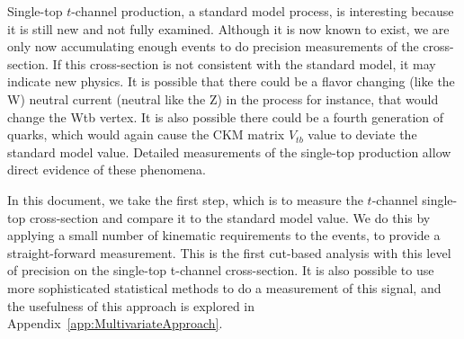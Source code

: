 Single-top $t$-channel production, a standard model process, is interesting because it is still new and not fully examined.  Although it is now known to exist, we are only now accumulating enough events to do precision measurements of the cross-section.  If this cross-section is not consistent with the standard model, it may indicate new physics.  It is possible that there could be a flavor changing (like the W) neutral current (neutral like the Z) in the process for instance, that would change the Wtb vertex.  It is also possible there could be a fourth generation of quarks, which would again cause the CKM matrix $V_{tb}$ value to deviate the standard model value.  Detailed measurements of the single-top production allow direct evidence of these phenomena.

In this document, we take the first step, which is to measure the $t$-channel single-top cross-section and compare it to the standard model value.  We do this by applying a small number of kinematic requirements to the events, to provide a straight-forward measurement.  This is the first cut-based analysis with this level of precision on the single-top t-channel cross-section.  It is also possible to use more sophisticated statistical methods to do a measurement of this signal, and the usefulness of this approach is explored in Appendix~\ref{app:MultivariateApproach}.
